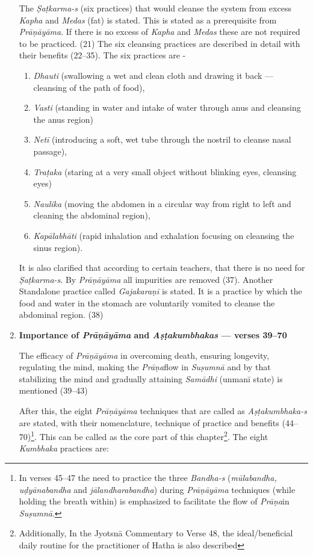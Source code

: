 \begin{enumerate}
The \textit{Ṣaṭkarma-s} (six practices)  that would cleanse the system from excess \textit{Kapha} and \textit{Medas} (fat) is stated. This is stated as a prerequisite from \textit{Prāṇāyāma}. If there is no excess of \textit{Kapha} and \textit{Medas} these are not required to be practiced.  (21) The six cleansing practices are described in detail with their benefits (22--35). The six practices are  -
\begin{enumerate}
\item \textit{Dhauti} (swallowing a wet and clean cloth and drawing it back --- cleansing of the path of food), 
\item \textit{Vasti} (standing in water and intake of water through anus and cleansing the anus region)          
\item \textit{Netī} (introducing a soft, wet tube through the nostril to cleanse nasal passage),                                  
\item \textit{Traṭaka} (staring at a very small object without blinking eyes, cleansing eyes)                            
\item \textit{Naulika} (moving the abdomen in a circular way from right to left and cleaning the abdominal region), 
\item \textit{Kapālabhāti} (rapid inhalation and exhalation focusing on cleansing the sinus region).
\end{enumerate}

It is also clarified that according to certain teachers, that there is no need for \textit{Ṣaṭkarma-s}. By \textit{Prāṇāyāma} all impurities are removed (37). Another Standalone practice called \textit{Gajakaraṇī} is stated. It is a practice by which the food and water in the stomach are voluntarily vomited to cleanse the abdominal region. (38) 

\item \textbf{Importance of \textit{Prāṇāyāma} and \textit{Aṣṭakumbhakas} --- verses 39--70}

The efficacy of \textit{Prāṇāyāma} in overcoming death, ensuring longevity, regulating the mind, making the \textit{Prāṇa}flow in \textit{Suṣumnā} and by that stabilizing the mind and gradually attaining \textit{Samādhi} (unmanī state) is mentioned (39--43)

After this, the eight \textit{Prāṇāyāma} techniques that are called as \textit{Aṣṭakumbhaka-s} are stated, with their nomenclature, technique of practice and benefits (44--70)\footnote{In verses 45--47 the need to practice the three \textit{Bandha-s} (\textit{mūlabandha, uḍyānabandha} and \textit{jālandharabandha}) during \textit{Prāṇāyāma} techniques  (while holding the breath within) is emphasized to facilitate the flow of \textit{Prāṇa}in \textit{Suṣumnā}.}. This can be called as the core part of this chapter\footnote{Additionally, In the Jyotsnā Commentary to Verse 48, the ideal/beneficial daily routine for the practitioner of Hatha is also described}. The eight \textit{Kumbhaka} practices are:


\end{enumerate}
